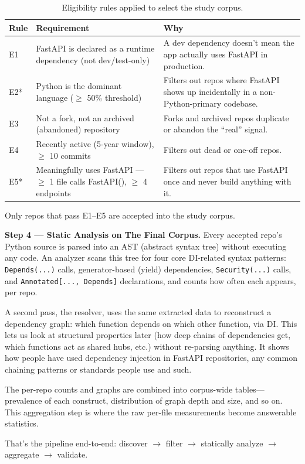 \begin{table}[!t]
\centering
\caption{Eligibility rules applied to select the study corpus.}
\label{tab:rules}
\begin{tabularx}{\linewidth}{@{}llX@{}}
\toprule
\textbf{Rule} & \textbf{Requirement} & \textbf{Why} \\
\midrule
E1 & FastAPI is declared as a runtime dependency (not dev/test-only) &
  A dev dependency doesn't mean the app actually uses FastAPI in production. \\
E2* & Python is the dominant language ($\geq$ 50\% threshold) &
  Filters out repos where FastAPI shows up incidentally in a non-Python-primary codebase. \\
E3 & Not a fork, not an archived (abandoned) repository &
  Forks and archived repos duplicate or abandon the ``real'' signal. \\
E4 & Recently active (5-year window), $\geq$ 10 commits &
  Filters out dead or one-off repos. \\
E5* & Meaningfully uses FastAPI --- $\geq$ 1 file calls FastAPI(), $\geq$ 4 endpoints &
  Filters out repos that use FastAPI once and never build anything with it. \\
\bottomrule
\end{tabularx}
\end{table}

Only repos that pass E1--E5 are accepted into the study corpus.

\textbf{Step 4 --- Static Analysis on The Final Corpus.} Every accepted repo's Python source is parsed into an AST (abstract syntax tree) without executing any code. An analyzer scans this tree for four core DI-related syntax patterns: \texttt{Depends(...)} calls, generator-based (yield) dependencies, \texttt{Security(...)} calls, and \texttt{Annotated[..., Depends]} declarations, and counts how often each appears, per repo.

A second pass, the resolver, uses the same extracted data to reconstruct a dependency graph: which function depends on which other function, via DI. This lets us look at structural properties later (how deep chains of dependencies get, which functions act as shared hubs, etc.) without re-parsing anything. It shows how people have used dependency injection in FastAPI repositories, any common chaining patterns or standards people use and such.

The per-repo counts and graphs are combined into corpus-wide tables---prevalence of each construct, distribution of graph depth and size, and so on. This aggregation step is where the raw per-file measurements become answerable statistics.

That's the pipeline end-to-end: discover $\rightarrow$ filter $\rightarrow$ statically analyze $\rightarrow$ aggregate $\rightarrow$ validate.
